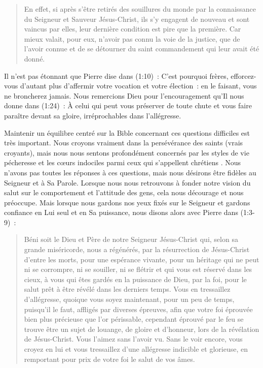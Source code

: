 \begin{quote}
 \og En effet, si après s'être retirés
 des souil\-lures du monde par la connaissance du Seigneur et Sauveur Jésus-Christ,
 ils s'y engagent de nouveau et sont vaincus par elles, leur dernière condition
 est pire que la première.
 Car mieux valait, pour eux, n'avoir pas connu la voie de la justice,
 que de l'avoir connue et de se détourner du saint commandement
 qui leur avait été donné. \fg{}
\end{quote}

\begin{digestpar}{\BRallowhypbch}
Il n'est pas étonnant que Pierre dise dans (1:10)~:
 \og C'est pourquoi frères, efforcez-vous d'autant plus d'affermir
 votre vocation et votre élection~: en le faisant, vous ne broncherez jamais. \fg{}
Nous remercions Dieu pour l'encouragement qu'Il nous donne dans (1:24)~:
 \og À celui qui peut vous préserver de toute chute et vous faire paraître
 devant sa gloire, irréprochables dans l'allégresse. \fg{}
\end{digestpar}

Maintenir un équilibre centré sur la Bible concernant ces questions difficiles est très important.
 Nous croyons vraiment dans la persévérance des saints (vrais croyants),
 mais nous nous sentons profondément concernés par les styles de vie pécheresse
 et les cœurs indociles parmi ceux qui s'appellent \og chrétiens \fg{}.
 Nous n'avons pas toutes les réponses à ces questions,
 mais nous désirons être fidèles au Seigneur et à Sa Parole.
 Lorsque nous nous retrouvons à fonder notre vision du salut
 sur le comportement et l'attitude des gens, cela nous
 décourage et nous préoccupe.
 Mais lorsque nous gardons nos yeux fixés sur le Seigneur et gardons confiance en Lui seul
 et en Sa puissance, nous disons alors avec Pierre dans
 (1:3-9)~:

\begin{quote}
\begin{digestpar}{}
 \og Béni soit le Dieu et Père de notre Seigneur Jésus-Christ qui,
 selon sa grande miséricorde, nous a régénérés, par la résurrection
 de Jésus-Christ d'entre les morts, pour une espérance vivante,
 pour un héritage qui ne peut ni se corrompre, ni se souiller,
 ni se flétrir et qui vous est réservé dans les cieux,
 à vous qui êtes gardés en la puissance de Dieu, par la foi,
 pour le salut prêt à être révélé dans les derniers temps.
 Vous en tressaillez d'allégresse, quoique vous soyez maintenant,
 pour un peu de temps, puisqu'il le faut, affligés par diverses épreuves,
 afin que votre foi éprouvée \ocadr bien plus précieuse que l'or périssable,
 cependant éprouvé par le feu \fcadr{} se trouve être un sujet de louange,
 de gloire et d'honneur, lors de la révélation de Jésus-Christ.
 Vous l'aimez sans l'avoir vu. Sans le voir encore, vous croyez en lui
 et vous tressaillez d'une allégresse indicible et glorieuse,
 en remportant pour prix de votre foi le salut de vos âmes. \fg{}
\end{digestpar}
\end{quote}

